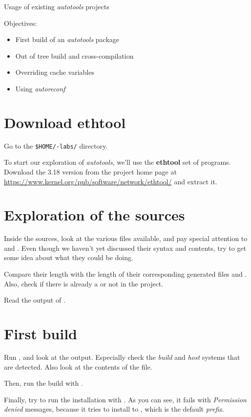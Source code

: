 \subchapter
{Usage of existing {\em autotools} projects}
{Objectives:
  \begin{itemize}
  \item First build of an {\em autotools} package
  \item Out of tree build and cross-compilation
  \item Overriding cache variables
  \item Using {\em autoreconf}
  \end{itemize}
}

\section{Download ethtool}

Go to the {\tt \$HOME/\longname-labs/} directory.

To start our exploration of {\em autotools}, we'll use the {\bf
  ethtool} set of programs. Download the 3.18 version from the project
home page at
\url{https://www.kernel.org/pub/software/network/ethtool/} and extract
it.

\section{Exploration of the sources}

Inside the sources, look at the various files available, and pay
special attention to  and . Even
though we haven't yet discussed their syntax and contents, try to get
some idea about what they could be doing.

Compare their length with the length of their corresponding generated
files  and . Also, check if there is
already a  or not in the project.

Read the output of .

\section{First build}

Run , and look at the output. Especially check the
{\em build} and {\em host} systems that are detected. Also look at the
contents of the  file.

Then, run the build with .

Finally, try to run the installation with . As you
can see, it fails with {\em Permission denied} messages, because it
tries to install to , which is the default {\em
  prefix}.

